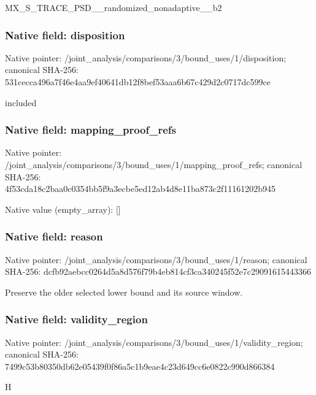\documentclass[10pt,a4paper]{article}
\begin{document}
\begingroup\raggedright\sloppy MX\_\allowbreak{}S\_\allowbreak{}TRACE\_\allowbreak{}PSD\_\allowbreak{}\_\allowbreak{}randomized\_\allowbreak{}nonadaptive\_\allowbreak{}\_\allowbreak{}b2\par\endgroup

\subsubsection{Native field: disposition}
Native pointer: /joint\_\allowbreak{}analysis/comparisons/3/bound\_\allowbreak{}uses/1/disposition; canonical SHA-256: 531cecca496a7f46e4aa9ef40641db12f8bef53aaa6b67c429d2c0717dc599ce

\begingroup\raggedright\sloppy included\par\endgroup

\subsubsection{Native field: mapping\_\allowbreak{}proof\_\allowbreak{}refs}
Native pointer: /joint\_\allowbreak{}analysis/comparisons/3/bound\_\allowbreak{}uses/1/mapping\_\allowbreak{}proof\_\allowbreak{}refs; canonical SHA-256: 4f53cda18c2baa0c0354bb5f9a3ecbe5ed12ab4d8e11ba873c2f11161202b945

Native value (empty\_\allowbreak{}array): []

\subsubsection{Native field: reason}
Native pointer: /joint\_\allowbreak{}analysis/comparisons/3/bound\_\allowbreak{}uses/1/reason; canonical SHA-256: dcfb92aebcc0264d5a8d576f79b4eb814cf3ca340245f52e7c29091615443366

\begingroup\raggedright\sloppy Preserve the older selected lower bound and its source window.\par\endgroup

\subsubsection{Native field: validity\_\allowbreak{}region}
Native pointer: /joint\_\allowbreak{}analysis/comparisons/3/bound\_\allowbreak{}uses/1/validity\_\allowbreak{}region; canonical SHA-256: 7499c53b80350db62e05439f0f86a5c1b9eae4c23d649cc6e0822c990d866384

\begingroup\raggedright\sloppy H\par\endgroup
\end{document}
